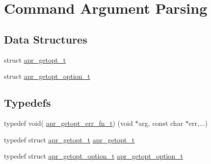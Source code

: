 \hypertarget{group__apr__getopt}{}\section{Command Argument Parsing}
\label{group__apr__getopt}
\subsection*{Data Structures}
\begin{DoxyCompactItemize}
\item 
struct \hyperlink{structapr__getopt__t}{apr\+\_\+getopt\+\_\+t}
\item 
struct \hyperlink{structapr__getopt__option__t}{apr\+\_\+getopt\+\_\+option\+\_\+t}
\end{DoxyCompactItemize}
\subsection*{Typedefs}
\begin{DoxyCompactItemize}
\item 
typedef void( \hyperlink{group__apr__getopt_ga67c949e3d93e50e12347acd92a3bbe18}{apr\+\_\+getopt\+\_\+err\+\_\+fn\+\_\+t}) (void $\ast$arg, const char $\ast$err,...)
\item 
typedef struct \hyperlink{structapr__getopt__t}{apr\+\_\+getopt\+\_\+t} \hyperlink{group__apr__getopt_gaed49565eab64803e93f76d0c40d6873d}{apr\+\_\+getopt\+\_\+t}
\item 
typedef struct \hyperlink{structapr__getopt__option__t}{apr\+\_\+getopt\+\_\+option\+\_\+t} \hyperlink{group__apr__getopt_ga114d2af52f3573eaeee2ffa73b2c4ff5}{apr\+\_\+getopt\+\_\+option\+\_\+t}
\end{DoxyCompactItemize}
